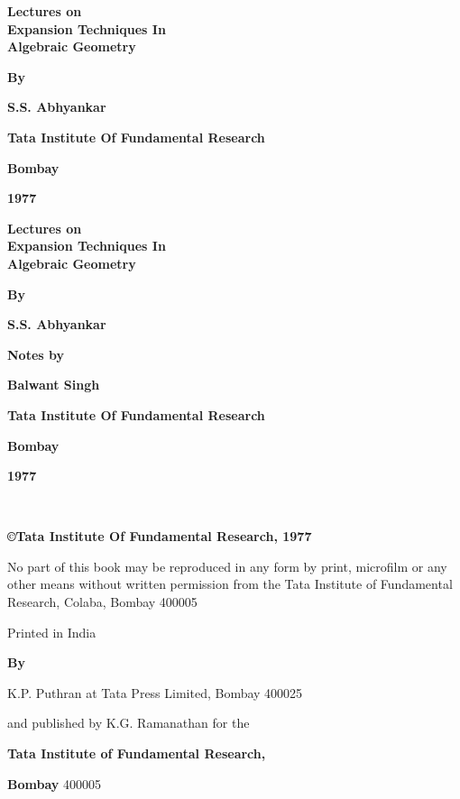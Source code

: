\thispagestyle{empty}

\begin{center}
{\Large\bf Lectures on}\\[5pt]
{\Large\bf Expansion Techniques In}\\[5pt]
{\Large\bf Algebraic Geometry}
\vfill

{\bf By}
\medskip

{\large\bf S.S. Abhyankar}
\vfill


{\bf Tata Institute Of Fundamental Research}
\medskip

{\bf Bombay}
\medskip

{\bf 1977}
\end{center}
\eject


\thispagestyle{empty}
\begin{center}
{\Large\bf Lectures on}\\[5pt]
{\Large\bf Expansion Techniques In\\[5pt] Algebraic Geometry}
\vfill

{\bf By}
\medskip

{\large\bf S.S. Abhyankar}
\vfill

{\bf Notes by}
\medskip

{\large\bf Balwant Singh}
\vfill

{\bf Tata Institute Of Fundamental Research}
\medskip

{\bf Bombay}
\medskip

{\bf 1977}
\end{center}
\eject

\thispagestyle{empty}
\begin{center}

~

\vfill

{\bf \copyright \quad Tata Institute Of Fundamental Research, 1977}
\medskip

\parbox{0.7\textwidth}{No part of this book may be reproduced
in any form by print, microfilm or any
other means without written permission
from the Tata Institute of Fundamental
Research, Colaba, Bombay 400005}
\vfill

Printed in India
\medskip

{\bf By}
\medskip

K.P. Puthran at Tata Press Limited, Bombay 400025
\medskip

and published by K.G. Ramanathan for the 
\medskip

{\bf Tata Institute of Fundamental Research,}
\medskip

{\bf Bombay} 400005
\end{center}

